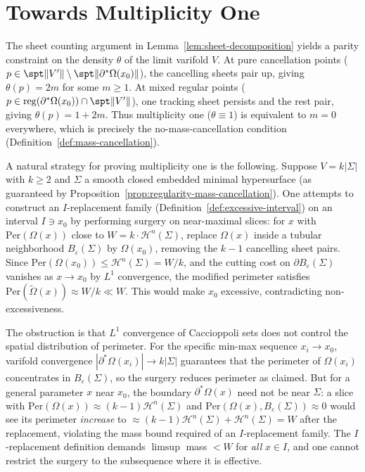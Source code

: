 \section{Towards Multiplicity One}\label{sec:multiplicity-one}

The sheet counting argument in Lemma~\ref{lem:sheet-decomposition} yields a parity constraint on the density $\theta$ of the limit varifold $V$. At pure cancellation points ($p \in \spt\|V'\| \setminus \spt\|\partial^*\Omega(x_0)\|$), the cancelling sheets pair up, giving $\theta(p) = 2m$ for some $m \geq 1$. At mixed regular points ($p \in \mathrm{reg}(\partial^*\Omega(x_0)) \cap \spt\|V'\|$), one tracking sheet persists and the rest pair, giving $\theta(p) = 1 + 2m$. Thus multiplicity one ($\theta \equiv 1$) is equivalent to $m = 0$ everywhere, which is precisely the no-mass-cancellation condition (Definition~\ref{def:mass-cancellation}).

A natural strategy for proving multiplicity one is the following. Suppose $V = k|\Sigma|$ with $k \geq 2$ and $\Sigma$ a smooth closed embedded minimal hypersurface (as guaranteed by Proposition~\ref{prop:regularity-mass-cancellation}). One attempts to construct an $I$-replacement family (Definition~\ref{def:excessive-interval}) on an interval $I \ni x_0$ by performing surgery on near-maximal slices: for $x$ with $\mathrm{Per}(\Omega(x))$ close to $W = k \cdot \mathcal{H}^n(\Sigma)$, replace $\Omega(x)$ inside a tubular neighborhood $B_\varepsilon(\Sigma)$ by $\Omega(x_0)$, removing the $k - 1$ cancelling sheet pairs. Since $\mathrm{Per}(\Omega(x_0)) \leq \mathcal{H}^n(\Sigma) = W/k$, and the cutting cost on $\partial B_\varepsilon(\Sigma)$ vanishes as $x \to x_0$ by $L^1$ convergence, the modified perimeter satisfies $\mathrm{Per}(\tilde{\Omega}(x)) \approx W/k \ll W$. This would make $x_0$ excessive, contradicting non-excessiveness.

The obstruction is that $L^1$ convergence of Caccioppoli sets does not control the spatial distribution of perimeter. For the specific min-max sequence $x_i \to x_0$, varifold convergence $|\partial^*\Omega(x_i)| \to k|\Sigma|$ guarantees that the perimeter of $\Omega(x_i)$ concentrates in $B_\varepsilon(\Sigma)$, so the surgery reduces perimeter as claimed. But for a general parameter $x$ near $x_0$, the boundary $\partial^*\Omega(x)$ need not be near $\Sigma$: a slice with $\mathrm{Per}(\Omega(x)) \approx (k-1)\mathcal{H}^n(\Sigma)$ and $\mathrm{Per}(\Omega(x), B_\varepsilon(\Sigma)) \approx 0$ would see its perimeter \emph{increase} to $\approx (k-1)\mathcal{H}^n(\Sigma) + \mathcal{H}^n(\Sigma) = W$ after the replacement, violating the mass bound required of an $I$-replacement family. The $I$-replacement definition demands $\limsup$ mass $< W$ for \emph{all} $x \in I$, and one cannot restrict the surgery to the subsequence where it is effective.

